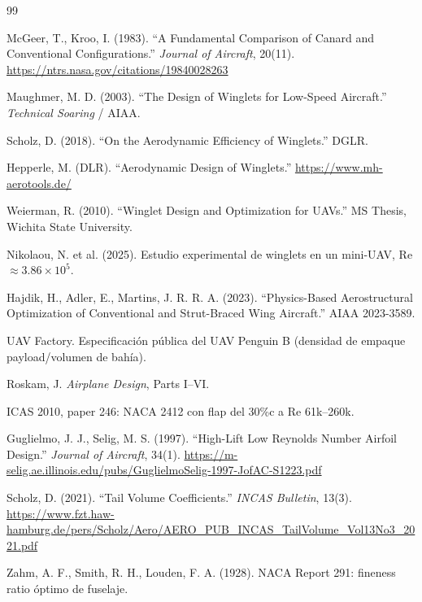 \documentclass[11pt,a4paper]{article}
\begin{document}
\begin{thebibliography}{99}

 McGeer, T., Kroo, I. (1983). ``A Fundamental Comparison of Canard and Conventional Configurations.'' \textit{Journal of Aircraft}, 20(11). \url{https://ntrs.nasa.gov/citations/19840028263}

 Maughmer, M. D. (2003). ``The Design of Winglets for Low-Speed Aircraft.'' \textit{Technical Soaring} / AIAA.

 Scholz, D. (2018). ``On the Aerodynamic Efficiency of Winglets.'' DGLR.

 Hepperle, M. (DLR). ``Aerodynamic Design of Winglets.'' \url{https://www.mh-aerotools.de/}

 Weierman, R. (2010). ``Winglet Design and Optimization for UAVs.'' MS Thesis, Wichita State University.

 Nikolaou, N. et al. (2025). Estudio experimental de winglets en un mini-UAV, Re$\approx3.86\times10^5$.

 Hajdik, H., Adler, E., Martins, J. R. R. A. (2023). ``Physics-Based Aerostructural Optimization of Conventional and Strut-Braced Wing Aircraft.'' AIAA 2023-3589.

 UAV Factory. Especificación pública del UAV Penguin B (densidad de empaque payload/volumen de bahía).

 Roskam, J. \textit{Airplane Design}, Parts I--VI.

 ICAS 2010, paper 246: NACA 2412 con flap del 30\%c a Re 61k--260k.

 Guglielmo, J. J., Selig, M. S. (1997). ``High-Lift Low Reynolds Number Airfoil Design.'' \textit{Journal of Aircraft}, 34(1). \url{https://m-selig.ae.illinois.edu/pubs/GuglielmoSelig-1997-JofAC-S1223.pdf}

 Scholz, D. (2021). ``Tail Volume Coefficients.'' \textit{INCAS Bulletin}, 13(3). \url{https://www.fzt.haw-hamburg.de/pers/Scholz/Aero/AERO_PUB_INCAS_TailVolume_Vol13No3_2021.pdf}

 Zahm, A. F., Smith, R. H., Louden, F. A. (1928). NACA Report 291: fineness ratio óptimo de fuselaje.

\end{thebibliography}
\end{document}
